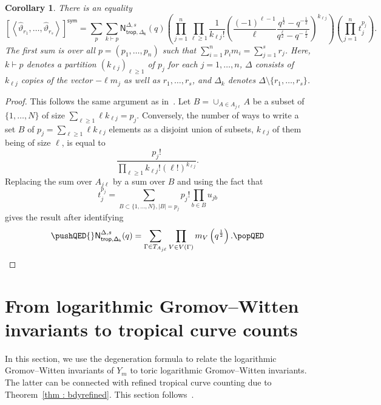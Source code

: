 \documentclass[11pt]{amsart}
\numberwithin{equation}{section}
\theoremstyle{plain}
\newtheorem{corollary}[theorem]{Corollary}
\theoremstyle{remark}
\theoremstyle{definition}
\begin{document}
\begin{corollary}\label{corollary : scatter to tropical}
    There is an equality 
    $$ \left[\left\langle\hat{\vartheta}_{r_1},\ldots,\hat{\vartheta}_{r_s}\right\rangle\right]^\mathsf{sym}
    = \sum_p \sum_{k \vdash p} \mathsf{N}^{\Delta,s}_{\mathsf{trop, \Delta_{k}}}(q)\left( \prod_{j=1}^n \prod_{\ell \geq 1} \frac{1}{k_{\ell j}!} \left(\frac{(-1)^{\ell -1}}{\ell} \frac{q^{\frac{1}{2}} - q^{-\frac{1}{2}}}{q^{\frac{\ell}{2}} - q^{-\frac{\ell}{2}}}\right)^{k_{\ell j}}\right)\left(\prod_{j=1}^n t_j^{p_j}\right).$$
    The first sum is over all $p=(p_1,\dots,p_n)$ such that $\sum_{i=1}^n p_i m_i = \sum_{j=1}^s r_j$. Here, $k \vdash p$ denotes a partition $(k_{\ell j})_{\ell \geq 1}$ of $p_j$ for each $j=1,\dots,n$, $\Delta$ consists of\, $k_{\ell j}$ copies of the vector $-\ell m_j$ as well as $r_1, \dots, r_s$, 
    and $\Delta_k$ denotes $\Delta \setminus \{r_1,\dots,r_s\}$.
\end{corollary}

\begin{proof}
This follows the same argument as in~\cite[Proof of Proposition 6.2]{bousseau2020quantumtrop}. Let $B=\cup_{A \in A_{j \ell}} A$ be a subset of $\{1,\dots,N\}$ of size $\sum_{\ell \geq 1} \ell k_{\ell j} = p_j$. Conversely, the number of ways to write a set
$B$ of $p_j = \sum_{\ell \geq 1} \ell k_{\ell j}$ elements as a disjoint union of subsets, $k_{\ell j}$ of them being of size $\ell$, is equal to $$\frac{p_j!}{\prod_{\ell \geq 1} k_{\ell j}! (\ell !)^{k_{\ell j}}}.$$ Replacing the sum over $A_{j\ell}$ by a sum over $B$ and using the fact that $$t_j^{p_j} = \sum_{B \subset \{1,\dots, N\}, |B| = p_j} p_j! \prod_{b \in B} u_{jb}$$ gives the result after identifying
\begin{equation*}\pushQED{\qed}
  \mathsf{N}^{\Delta,s}_{\mathsf{trop, \Delta_{k}}}(q) = \sum_{\Gamma \in T_{A_{j \ell}}} \prod_{V \in V(\Gamma)}m_{V}\left(q^{\frac{1}{2}}\right).\qedhere \popQED
  \end{equation*}
\renewcommand{\qed}{}    
\end{proof}

\section{From logarithmic Gromov--Witten invariants to tropical curve counts}

In this section, we use the degeneration formula to relate the logarithmic Gromov--Witten invariants of $Y_m$ to toric logarithmic Gromov--Witten invariants. The latter can be connected with refined tropical curve counting due to Theorem~\ref{thm : bdyrefined}. This section follows~\cite[Section 5]{bousseau2020quantum}.
\end{document}
